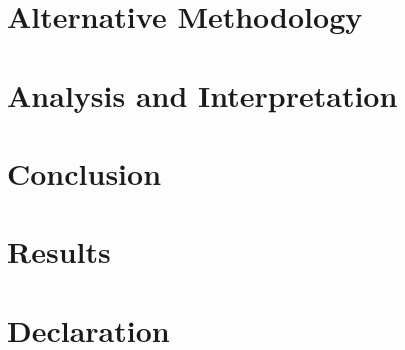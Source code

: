 \documentclass[12pt]{report}
\begin{document}
\chapter{Alternative Methodology} \label{am}


\chapter{Analysis and Interpretation}\label{ai}


\chapter{Conclusion} \label{c}


\chapter{Results} \label{ra}




\chapter*{Declaration}

\end{document}
